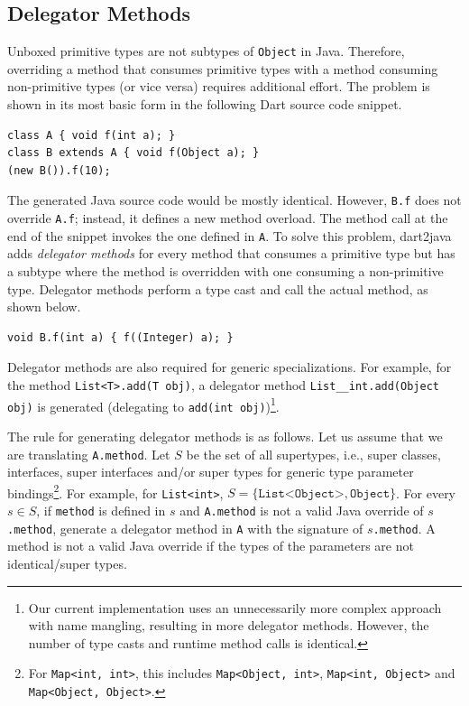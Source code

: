 \documentclass[sigplan,9pt]{acmart}
\begin{document}
\subsection{Delegator Methods}
Unboxed primitive types are not subtypes of \texttt{Object} in Java. Therefore, overriding a method that consumes primitive types with a method consuming non-primitive types (or vice versa) requires additional effort. The problem is shown in its most basic form in the following Dart source code snippet.

\begin{lstlisting}
class A { void f(int a); }
class B extends A { void f(Object a); }
(new B()).f(10);
\end{lstlisting}

The generated Java source code would be mostly identical. However, \texttt{B.f} does not override \texttt{A.f}; instead, it defines a new method overload. The method call at the end of the snippet invokes the one defined in \texttt{A}. To solve this problem, dart2java adds \emph{delegator methods} for every method that consumes a primitive type but has a subtype where the method is overridden with one consuming a non-primitive type. Delegator methods perform a type cast and call the actual method, as shown below.

\begin{lstlisting}
void B.f(int a) { f((Integer) a); }
\end{lstlisting}

Delegator methods are also required for generic specializations. For example, for the method \texttt{List<T>.add(T obj)}, a delegator method \texttt{List\_\_int.add(Object obj)} is generated (delegating to \texttt{add(int obj)})\footnote{Our current implementation uses an unnecessarily more complex approach with name mangling, resulting in more delegator methods. However, the number of type casts and runtime method calls is identical.}.

The rule for generating delegator methods is as follows. Let us assume that we are translating \texttt{A.method}. Let $S$ be the set of all supertypes, i.e., super classes, interfaces, super interfaces and/or super types for generic type parameter bindings\footnote{For \texttt{Map<int, int>}, this includes \texttt{Map<Object, int>}, \texttt{Map<int, Object>} and \texttt{Map<Object, Object>}.}. For example, for \texttt{List<int>}, $S=\{\texttt{List<Object>}, \texttt{Object} \}$. For every $s \in S$, if \texttt{method} is defined in $s$ and \texttt{A.method} is not a valid Java override of \texttt{$s$.method}, generate a delegator method in \texttt{A} with the signature of \texttt{$s$.method}. A method is not a valid Java override if the types of the parameters are not identical/super types.
\end{document}
